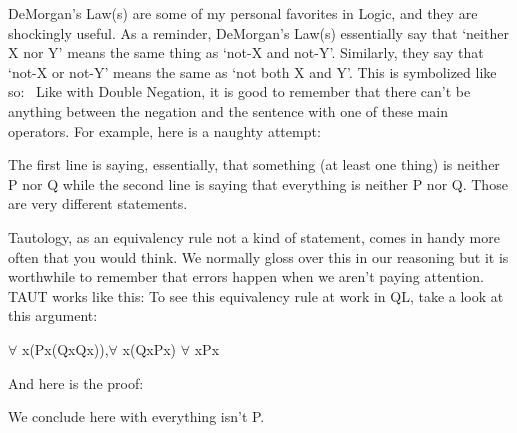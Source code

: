 DeMorgan's Law(s) are some of my personal favorites in Logic, and they are shockingly useful. As a reminder, DeMorgan's Law(s) essentially say that `neither X nor Y' means the same thing as `not-X and not-Y'. Similarly, they say that `not-X or not-Y' means the same as `not both X and Y'. This is symbolized like so: 
Like with Double Negation, it is good to remember that there can't be anything between the negation and the sentence with one of these main operators. For example, here is a naughty attempt: 
\begin{fitchproof}
\end{fitchproof}
The first line is saying, essentially, that something (at least one thing) is neither P nor Q while the second line is saying that everything is neither P nor Q. Those are very different statements. 

Tautology, as an equivalency rule not a kind of statement, comes in handy more often that you would think. We normally gloss over this in our reasoning but it is worthwhile to remember that errors happen when we aren't paying attention. TAUT works like this:
To see this equivalency rule at work in QL, take a look at this argument:
\begin{center}
$\forall$ x(Px\eif (Qx\eand Qx)),$\forall$ x(Qx\eif \enot Px) \therefore  $\forall$ x\enot Px
\end{center}
And here is the proof:
\begin{fitchproof}
\end{fitchproof}

We conclude here with everything isn't P. 
